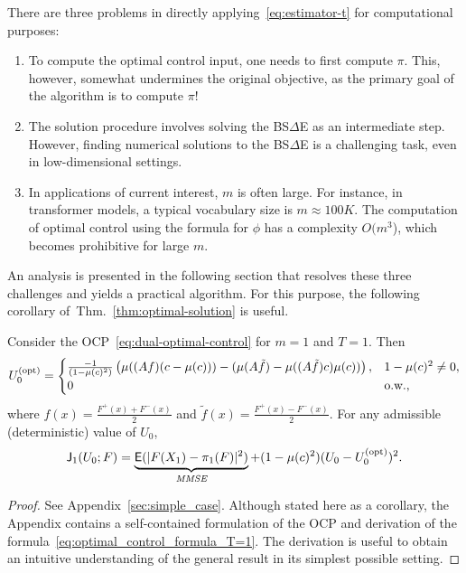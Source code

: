\documentclass[twoside,11pt]{article}
\def\E{{\sf E}}
\def\E{{\sf E}}
\def\Thm#1{Thm.~\ref{#1}}
\def\E{{\sf E}}
\def\sJ{{\sf J}}
\def\opt{{\text{\rm (opt)}}}
\begin{document}
There are three problems in directly applying~\eqref{eq:estimator-t} for computational
purposes:
\begin{enumerate}
\item To compute the optimal control input, one needs to first compute
  $\pi$.  This, however,
  somewhat undermines the original objective, as the primary goal of
  the algorithm is to compute $\pi$!
\item The solution procedure involves solving the BS$\Delta$E as an
  intermediate step. However, finding numerical solutions to the
  BS$\Delta$E is a challenging task, even in low-dimensional
  settings. 
\item In applications of current interest, $m$ is often large.  For
  instance, in transformer models, a typical vocabulary size is $m\approx
  100 K$. The computation of optimal control using the
  formula for $\phi$ has a complexity $O(m^3$), which becomes prohibitive for large $m$.
\end{enumerate}
An analysis is presented in the following section that resolves these
three challenges and yields a practical algorithm.  For this purpose,
the following corollary of~\Thm{thm:optimal-solution} is useful.



\begin{corollary}\label{prop:optimal_control_formula_T=1}
  Consider the OCP~\eqref{eq:dual-optimal-control} for $m=1$ and $T=1$.  Then 
  \begin{equation}\label{eq:optimal_control_formula_T=1}
    U_0^\opt = \begin{cases}
      \frac{-1}{(1-\mu(c)^2)} \left( \mu((Af)(c-\mu(c))) - (\mu(A\tilde f) - \mu((A\tilde f)c) \mu(c))\right), & 1-\mu(c)^2 \neq 0, \\
      0 & \text{o.w.},
    \end{cases} 
  \end{equation}
  where $f(x) = \frac{F^+(x)+F^-(x)}{2}$ and $\tilde f(x) = \frac{F^+(x)-F^-(x)}{2}$.
  For any admissible (deterministic) value of $U_0$,
  \begin{align*}
    \sJ_1(U_0;F) = \underbrace{\E (|F(X_1) - \pi_1(F)|^2)}_{\emph{MMSE}} +(1-\mu(c)^2) (U_0-U_0^\opt)^2.
  \end{align*}
\end{corollary}

     \begin{proof}
       See Appendix~\ref{sec:simple_case}.  
       Although stated here as a corollary, the
       Appendix contains a self-contained formulation of the OCP and derivation of the formula~\eqref{eq:optimal_control_formula_T=1}.  The derivation is useful to obtain an intuitive
       understanding of the general result in its simplest possible setting.  
     \end{proof}
\end{document}

